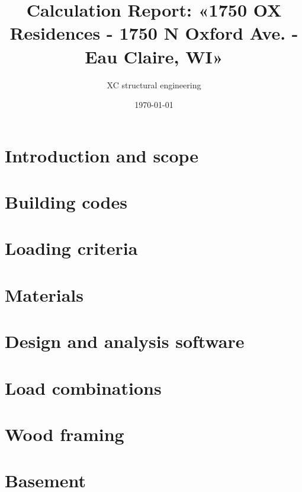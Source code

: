 

\usepackage{array, boldline, makecell, booktabs}
\newcommand\btrule[1]{\specialrule{#1}{0pt}{0pt}}
\usepackage{colortbl}
\usepackage{multicol,caption}               %
\usepackage{xcolor}
\newenvironment{Figure}
  {\par\medskip\noindent\minipage{\linewidth}}
  {\endminipage\par\medskip}
\usepackage{caption}
\usepackage[section]{placeins}
\usepackage{units}

\title{Calculation Report: «1750 OX Residences - 1750 N Oxford Ave. - Eau Claire, WI» }
\author{XC structural engineering}
\date{\today}
\newcommand{\revision}{0.2}
\newcommand{\titdocum}{Calculation Report}

\maketitle
\tableofcontents
\listoftables
\listoffigures
\cleardoublepage
\section{Introduction and scope}

\section{Building codes}

\section{Loading criteria}

\section{Materials}

\section{Design and analysis software}

\section{Load combinations}

\section{Wood framing}

\section{Basement}

